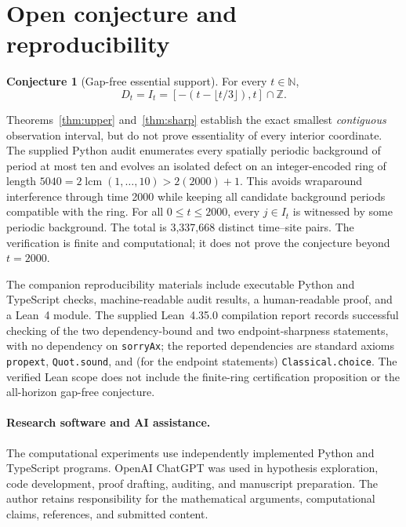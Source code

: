 \documentclass[11pt,a4paper]{article}
\theoremstyle{definition}
\newtheorem{conjecture}[theorem]{Conjecture}
\theoremstyle{remark}
\newcommand{\Z}{\mathbb{Z}}
\newcommand{\N}{\mathbb{N}}
\begin{document}
\section{Open conjecture and reproducibility}
\begin{conjecture}[Gap-free essential support]
For every $t\in\N$,
\[
 D_t=I_t=[-(t-\lfloor t/3\rfloor),t]\cap\Z.
\]
\end{conjecture}
Theorems~\ref{thm:upper} and~\ref{thm:sharp} establish the exact smallest \emph{contiguous} observation interval, but do not prove essentiality of every interior coordinate. The supplied Python audit enumerates every spatially periodic background of period at most ten and evolves an isolated defect on an integer-encoded ring of length $5040=2\operatorname{lcm}(1,\ldots,10)>2(2000)+1$. This avoids wraparound interference through time 2000 while keeping all candidate background periods compatible with the ring. For all $0\le t\le2000$, every $j\in I_t$ is witnessed by some periodic background. The total is 3,337,668 distinct time--site pairs. The verification is finite and computational; it does not prove the conjecture beyond $t=2000$.

The companion reproducibility materials include executable Python and TypeScript checks, machine-readable audit results, a human-readable proof, and a Lean~4 module. The supplied Lean~4.35.0 compilation report records successful checking of the two dependency-bound and two endpoint-sharpness statements, with no dependency on \texttt{sorryAx}; the reported dependencies are standard axioms \texttt{propext}, \texttt{Quot.sound}, and (for the endpoint statements) \texttt{Classical.choice}. The verified Lean scope does not include the finite-ring certification proposition or the all-horizon gap-free conjecture.

\paragraph{Research software and AI assistance.} The computational experiments use independently implemented Python and TypeScript programs. OpenAI ChatGPT was used in hypothesis exploration, code development, proof drafting, auditing, and manuscript preparation. The author retains responsibility for the mathematical arguments, computational claims, references, and submitted content.
\end{document}
